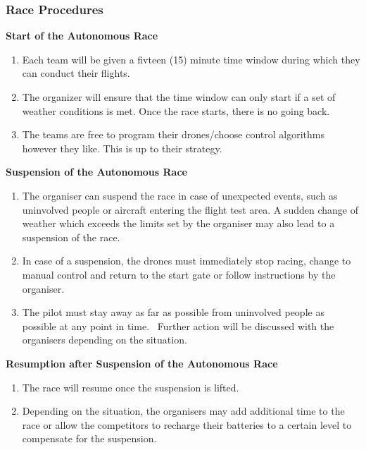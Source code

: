     \subsubsection{Race Procedures}
    \textbf{Start of the Autonomous Race}
    \begin{enumerate}
    \item Each team will be given a fivteen (15) minute time window during which they can conduct their flights. 
    \item The organizer will ensure that the time window can only start if a set of weather conditions is met. Once the race starts, there is no going back.
    \item The teams are free to program their drones/choose control algorithms however they like. This is up to their strategy. 
    \end{enumerate}

    \textbf{Suspension of the Autonomous Race}
    \begin{enumerate}[resume]
    \item The organiser can suspend the race in case of unexpected events, such as uninvolved people or aircraft entering the flight test area. A sudden change of weather which exceeds the limits set by the organiser may also lead to a suspension of the race.
    \item In case of a suspension, the drones must immediately stop racing, change to manual control and return to the start gate or follow instructions by the organiser.
    \item The pilot must stay away as far as possible from uninvolved people as possible at any point in time.
    \ Further action will be discussed with the organisers depending on the situation.
    \end{enumerate}

    \textbf{Resumption after Suspension of the Autonomous Race}
    \begin{enumerate}[resume]
    \item The race will resume once the suspension is lifted.
    \item Depending on the situation, the organisers may add additional time to the race or allow the competitors to recharge their batteries to a certain level to compensate for the suspension.
    \end{enumerate}

    
    

  



